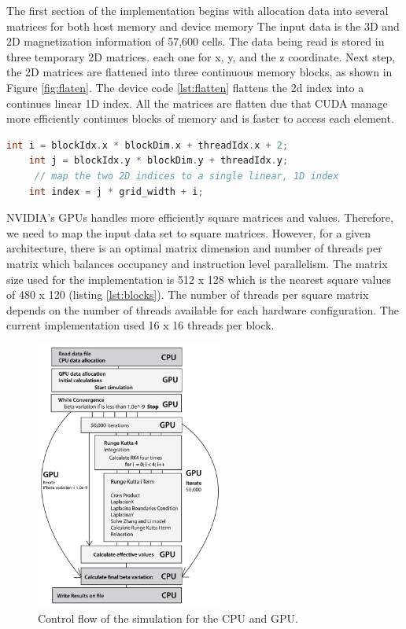 The first section of the implementation begins with allocation data into several matrices for both host memory and device memory The input data is the 3D and 2D magnetization information of 57,600 cells. The data being read is stored in three temporary 2D matrices. each one for x, y, and the z coordinate. Next step, the 2D matrices are flattened into three continuous memory blocks, as shown in Figure \ref{fig:flaten}. The device code \ref{lst:flatten} flattens the 2d index into a continues linear 1D index. All the matrices are flatten due that CUDA manage more efficiently continues blocks of memory and is faster to access each element.

\begin{lstlisting}[language=C++, label={lst:flatten}, caption={Kernel flatten 2d - 1d}]	
    int i = blockIdx.x * blockDim.x + threadIdx.x + 2;
    int j = blockIdx.y * blockDim.y + threadIdx.y;
     // map the two 2D indices to a single linear, 1D index
    int index = j * grid_width + i; 
\end{lstlisting}


NVIDIA's GPUs handles more efficiently square matrices and values. Therefore, we need to map the input data set to square matrices. However, for a given architecture, there is an optimal matrix dimension and number of threads per matrix which balances occupancy and instruction level parallelism.  The matrix size used for the implementation is 512 x 128 which is the nearest square values of 480 x 120 (listing  \ref{lst:blocks}). The number of threads per square matrix depends on the number of threads available for each hardware configuration. The current implementation used 16 x 16 threads per block.
 
\begin{figure}[htbp]
	\centering
		\includegraphics[width=0.55\textwidth]{Figures/flow.png}
		\smallskip
	\caption[Control flow]{Control flow of the simulation for the CPU and GPU.}
	\label{fig:flow}
\end{figure}

